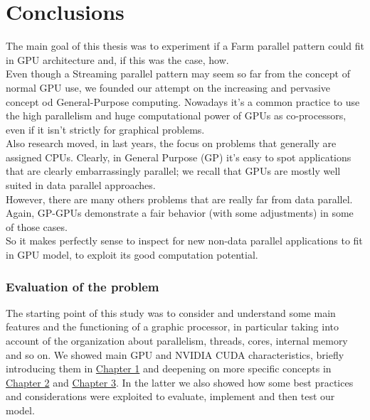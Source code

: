 \chapter{Conclusions} \label{chap:conclusions}
The main goal of this thesis was to experiment if a Farm parallel pattern could fit in GPU architecture and, if this was the case, how.\\
Even though a Streaming parallel pattern may seem so far from the concept of normal GPU use, we founded our attempt on the increasing and pervasive concept od General-Purpose computing.
Nowadays it's a common practice to use the high parallelism and huge computational power of GPUs as co-processors, even if it isn't strictly for graphical problems.\\
Also research moved, in last years, the focus on problems that generally are assigned CPUs. Clearly, in General Purpose (GP) it's easy to spot applications that are clearly embarrassingly parallel; we recall that GPUs are mostly well suited in data parallel approaches.\\
However, there are many others problems that are really far from data parallel. Again, GP-GPUs demonstrate a fair behavior (with some adjustments) in some of those cases.\\
So it makes perfectly sense to inspect for new non-data parallel applications to fit in GPU model, to exploit its good computation potential.

\subsection{Evaluation of the problem}
The starting point of this study was to consider and understand some main features and the functioning of a graphic processor, in particular taking into account of the organization about parallelism, threads, cores, internal memory and so on. We showed main GPU and NVIDIA CUDA characteristics, briefly introducing them in \hyperref[chap:into]{Chapter 1} and deepening on more specific concepts in \hyperref[chap:tools]{Chapter 2} and \hyperref[chap:logic]{Chapter 3}. In the latter we also showed how some best practices and considerations were exploited to evaluate, implement and then test our model. \\

